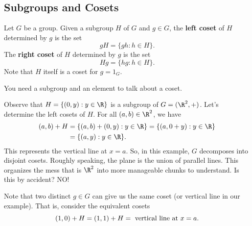 \subsection{Subgroups and Cosets}

\begin{definition}
    Let \( G  \) be a group. Given a subgroup \( H  \) of \( G  \) and \( g \in G  \), the \textbf{left coset} of \( H  \) determined by \( g  \) is the set 
    \[  gH = \{  g h : h \in H  \}. \]
    The \textbf{right coset} of \( H  \) determined by \( g  \) is the set
    \[  Hg = \{  h g : h \in H  \}. \]
    Note that \( H  \) itself is a coset for \( g = {1}_{G} \). 
\end{definition}

You need a subgroup and an element to talk about a coset.

\begin{eg}[\( G = (\R^2, +) , H = \text{y-axis}  \) (Very important!)]
    Observe that \( H = \{  (0,y) : y \in \R  \}   \) is a subgroup of \( G = (\R^{2}, + ) \). Let's determine the left cosets of \( H  \).  For all \( (a,b) \in \R^{2} \), we have 
    \begin{align*}
        (a,b) + H &= \{  (a,b ) + (0,y) : y \in \R  \}  = \{  (a,0+y) : y \in \R  \}  \\
                  &= \{  (a,y) : y \in \R  \}.
    \end{align*}
    This represents the vertical line at \( x = a  \). So, in this example, \( G  \) decomposes into disjoint cosets. Roughly speaking, the plane is the union of parallel lines. This organizes the mess that is \( \R^{2} \) into more manageable chunks to understand. Is this by accident? NO!

    Note that two distinct \( g \in G  \) can give us the same coset (or vertical line in our example). That is, consider the equivalent cosets
    \[  (1,0) + H = (1,1) + H  = \ \text{vertical line at \( x = a  \)}. \]
\end{eg}

